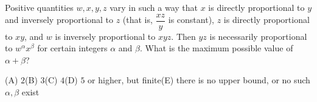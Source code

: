 Positive quantities $w,x,y,z$ vary in such a way that $x$ is directly proportional to $y$ and inversely proportional to $z$ (that is, $\dfrac{xz}{y}$ is constant), $z$ is directly proportional to $xy$, and $w$ is inversely proportional to $xyz$. Then $yz$ is necessarily proportional to $w^{\alpha}x^{\beta}$ for certain integers $\alpha$ and $\beta$. What is the maximum possible value of $\alpha+\beta$?

(A) $2$\qquad (B) $3$\qquad (C) $4$\qquad (D) $5$ or higher, but finite\qquad (E) there is no upper bound, or no such $\alpha,\beta$ exist
